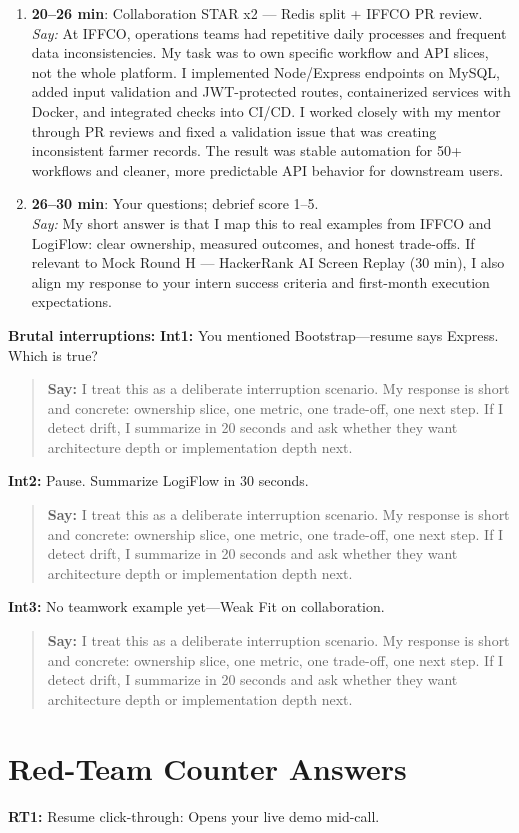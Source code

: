 \documentclass[9pt,a4paper]{article}
\begin{document}
\begin{enumerate}
  \item \textbf{20--26 min}: Collaboration STAR x2 --- Redis split + IFFCO PR review.\\
  \textit{Say:} At IFFCO, operations teams had repetitive daily processes and frequent data inconsistencies. My task was to own specific workflow and API slices, not the whole platform. I implemented Node/Express endpoints on MySQL, added input validation and JWT-protected routes, containerized services with Docker, and integrated checks into CI/CD. I worked closely with my mentor through PR reviews and fixed a validation issue that was creating inconsistent farmer records. The result was stable automation for 50+ workflows and cleaner, more predictable API behavior for downstream users.
  \item \textbf{26--30 min}: Your questions; debrief score 1--5.\\
  \textit{Say:} My short answer is that I map this to real examples from IFFCO and LogiFlow: clear ownership, measured outcomes, and honest trade-offs. If relevant to Mock Round H --- HackerRank AI Screen Replay (30 min), I also align my response to your intern success criteria and first-month execution expectations.
\end{enumerate}
\textbf{Brutal interruptions:}
\textbf{Int1:} You mentioned Bootstrap---resume says Express. Which is true?

\begin{quote}\small\textbf{Say:} I treat this as a deliberate interruption scenario. My response is short and concrete: ownership slice, one metric, one trade-off, one next step. If I detect drift, I summarize in 20 seconds and ask whether they want architecture depth or implementation depth next.\end{quote}
\vspace{2mm}
\textbf{Int2:} Pause. Summarize LogiFlow in 30 seconds.

\begin{quote}\small\textbf{Say:} I treat this as a deliberate interruption scenario. My response is short and concrete: ownership slice, one metric, one trade-off, one next step. If I detect drift, I summarize in 20 seconds and ask whether they want architecture depth or implementation depth next.\end{quote}
\vspace{2mm}
\textbf{Int3:} No teamwork example yet---Weak Fit on collaboration.

\begin{quote}\small\textbf{Say:} I treat this as a deliberate interruption scenario. My response is short and concrete: ownership slice, one metric, one trade-off, one next step. If I detect drift, I summarize in 20 seconds and ask whether they want architecture depth or implementation depth next.\end{quote}
\vspace{2mm}
\newpage\section{Red-Team Counter Answers}
\textbf{RT1:} Resume click-through: Opens your live demo mid-call.
\end{document}

